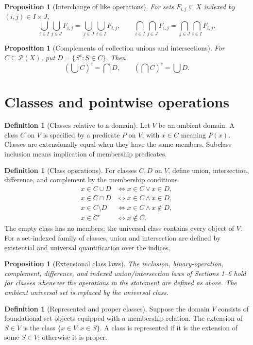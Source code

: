 \documentclass[11pt]{article}
\newtheorem{proposition}[theorem]{Proposition}
\theoremstyle{definition}
\newtheorem{definition}[theorem]{Definition}
\newcommand{\Pow}{\mathcal P}
\begin{document}
\begin{proposition}[Interchange of like operations]
For sets $F_{i,j}\subseteq X$ indexed by $(i,j)\in I\times J$,
\[
\bigcup_{i\in I}\bigcup_{j\in J}F_{i,j}
=\bigcup_{j\in J}\bigcup_{i\in I}F_{i,j},\qquad
\bigcap_{i\in I}\bigcap_{j\in J}F_{i,j}
=\bigcap_{j\in J}\bigcap_{i\in I}F_{i,j}.
\]
\end{proposition}
\begin{proposition}[Complements of collection unions and intersections]
For $C\subseteq\Pow(X)$, put $D=\{S^c:S\in C\}$. Then
\[
(\bigcup C)^c=\bigcap D,\qquad (\bigcap C)^c=\bigcup D.
\]
\end{proposition}

\newpage
\section{Classes and pointwise operations}
\begin{definition}[Classes relative to a domain]
Let $V$ be an ambient domain. A class $C$ on $V$ is specified by a
predicate $P$ on $V$, with $x\in C$ meaning $P(x)$.
Classes are extensionally equal when they have the same members.
Subclass inclusion means implication of membership predicates.
\end{definition}
\begin{definition}[Class operations]
For classes $C,D$ on $V$, define union, intersection, difference, and
complement by the membership conditions
\begin{align*}
x\in C\cup D&\iff x\in C\lor x\in D,\\
x\in C\cap D&\iff x\in C\land x\in D,\\
x\in C\setminus D&\iff x\in C\land x\notin D,\\
x\in C^c&\iff x\notin C.
\end{align*}
The empty class has no members; the universal class contains every object of $V$.
For a set-indexed family of classes, union and intersection are defined
by existential and universal quantification over the indices.
\end{definition}
\begin{proposition}[Extensional class laws]
The inclusion, binary-operation, complement, difference, and indexed
union/intersection laws of Sections 1--6 hold for classes whenever
the operations in the statement are defined as above. The ambient
universal set is replaced by the universal class.
\end{proposition}
\begin{definition}[Represented and proper classes]
Suppose the domain $V$ consists of foundational set objects equipped
with a membership relation. The extension of $S\in V$ is the class
$\{x\in V:x\in S\}$. A class is represented if it is the extension of
some $S\in V$; otherwise it is proper.
\end{definition}
\end{document}
